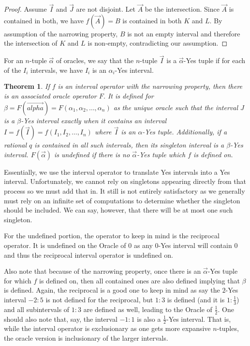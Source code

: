 \documentclass[12pt]{article}
\newtheorem{theorem}{Theorem}
\theoremstyle{remark}
\begin{document}
\begin{proof}
Assume $\vec{I}$ and $\vec{J}$ are not disjoint. Let $\vec{A}$ be the intersection. Since $\vec{A}$ is contained in both, we have $f(\vec A)= B$ is contained in both $K$ and $L$. By assumption of the narrowing property, $B$ is not an empty interval and therefore the intersection of $K$ and $L$ is non-empty, contradicting our assumption. 
\end{proof}

For an $n$-tuple $\vec{\alpha}$ of oracles, we say that the $n$-tuple $\vec{I}$ is a $\vec{\alpha}$-Yes tuple if for each of the $I_i$ intervals, we have $I_i$ is an $\alpha_i$-Yes interval. 

\begin{theorem}
If $f$ is an interval operator with the narrowing property, then there is an associated oracle operator $F$. It is defined for $\beta = F(\vec{alpha}) = F(\alpha_1, \alpha_2, \ldots, \alpha_n)$ as the unique oracle such that the interval $J$ is a $\beta$-Yes interval exactly when it contains an interval $I = f(\vec{I}) = f(I_1, I_2, \ldots, I_n)$ where $\vec{I}$ is an $\alpha$-Yes tuple. Additionally, if a rational $q$ is contained in all such intervals, then its singleton interval is a $\beta$-Yes interval. $F(\vec{\alpha})$ is undefined if there is no $\vec{\alpha}$-Yes tuple which $f$ is defined on. 
\end{theorem}

Essentially, we use the interval operator to translate Yes intervals into a Yes interval. Unfortunately, we cannot rely on singletons appearing directly from that process so we must add that in. It still is not entirely satisfactory as we generally must rely on an infinite set of computations to determine whether the singleton should be included. We can say, however, that there will be at most one such singleton. 

For the undefined portion, the operator to keep in mind is the reciprocal operator. It is undefined on the Oracle of 0 as any 0-Yes interval will contain 0 and thus the reciprocal interval operator is undefined on. 

Also note that because of the narrowing property, once there is an $\vec{\alpha}$-Yes tuple for which $f$ is defined on, then all contained ones are also defined implying that $\beta$ is defined. Again, the reciprocal is a good one to keep in mind as say the $2$-Yes interval $-2:5$ is not defined for the reciprocal, but $1:3$ is defined (and it is $1:\frac{1}{3}$) and all subintervals of $1:3$ are defined as well, leading to the Oracle of $\frac{1}{2}$. One should also note that, say, the interval $-1:1$ is also a $\frac{1}{2}$-Yes interval. That is, while the interval operator is exclusionary as one gets more expansive $n$-tuples, the oracle version is inclusionary of the larger intervals. 
\end{document}

